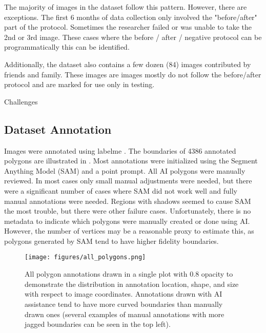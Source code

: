 \documentclass[10pt,twocolumn,letterpaper]{article}
\begin{document}
The majority of images in the dataset follow this pattern.
However, there are exceptions.
The first 6 months of data collection only involved the "before/after" part of the protocol.
Sometimes the researcher failed or was unable to take the 2nd or 3rd image.
These cases where the before / after / negative protocol can be
programmatically this can be identified.

Additionally, the dataset also contains a few dozen (84) images contributed
by friends and family. These images are images mostly do not follow the
before/after protocol and are marked for use only in testing.


Challenges

\subsection{Dataset Annotation}

Images were annotated using labelme \cite{wada_labelmeailabelme_nodate}. 
The boundaries of 4386 annotated polygons are illustrated in .
Most annotations were initialized using the Segment Anything Model (SAM)
\cite{kirillov_segment_2023} and a point prompt. 
All AI polygons were manually reviewed. In most cases only small manual
adjustments were needed, but there were a significant number of cases where SAM
did not work well and fully manual annotations were needed.
Regions with shadows seemed to cause SAM the most trouble, but there were other
failure cases. Unfortunately, there is no metadata to indicate which polygons
were manually created or done using AI.  However, the number of vertices may be
a reasonable proxy to estimate this, as polygons generated by SAM tend to have
higher fidelity boundaries. 


\begin{figure}[h]
\centering
\texttt{[image: figures/all\_polygons.png]}
\caption[]{
    All polygon annotations drawn in a single plot with 0.8 opacity to
    demonstrate the distribution in annotation location, shape, and size with
    respect to image coordinates. Annotations drawn with AI
    assistance tend to have more curved boundaries than manually drawn ones
    (several examples of manual annotations with more jagged boundaries can be
    seen in the top left).
}
\label{fig:AllPolygons}
\end{figure}
\end{document}
